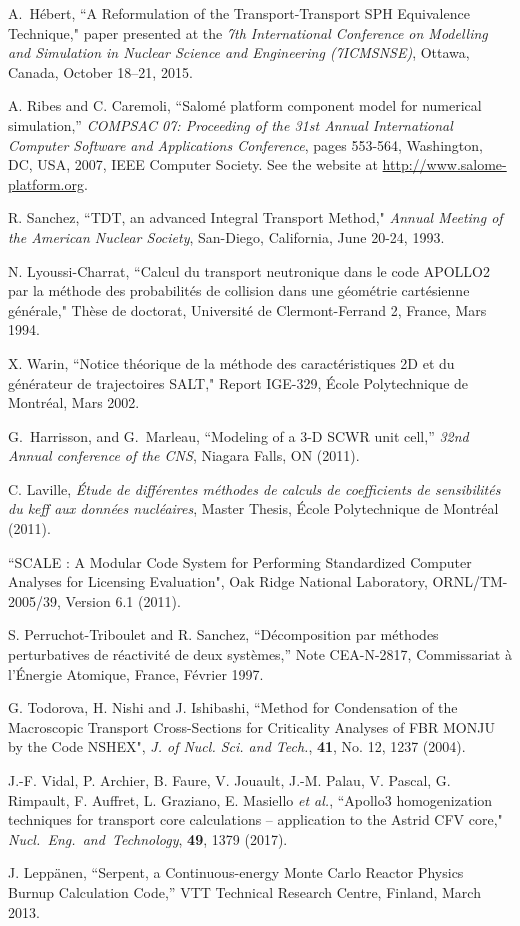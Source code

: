 \begin{thebibliography}{99}
A.~H\'ebert, ``A Reformulation of the Transport-Transport SPH Equivalence Technique," paper presented at the
\textsl{7th International Conference on Modelling and Simulation in Nuclear Science and Engineering (7ICMSNSE)}, Ottawa, Canada, October 18--21, 2015.

A. Ribes and C. Caremoli, ``Salom\'e platform component model for numerical simulation,'' {\sl COMPSAC 07: Proceeding of the 31st Annual International Computer Software and Applications Conference}, pages 553-564, Washington, DC, USA, 2007, IEEE Computer Society.
See the website at \url{http://www.salome-platform.org}.

R. Sanchez, ``TDT, an advanced Integral Transport Method," {\sl Annual Meeting of the American Nuclear Society}, San-Diego, California, June 20-24, 1993.

N. Lyoussi-Charrat, ``Calcul du transport neutronique dans le code APOLLO2 par la m\'ethode des probabilit\'es de
collision dans une g\'eom\'etrie cart\'esienne g\'en\'erale," Th\`ese de doctorat, Universit\'e de Clermont-Ferrand 2, France,
Mars 1994.

X. Warin, ``Notice th\'eorique de la m\'ethode des caract\'eristiques 2D et du g\'en\'erateur de trajectoires SALT," Report IGE-329, \'Ecole Polytechnique de Montr\'eal, Mars 2002.

 G.~Harrisson, and G.~Marleau, ``Modeling of a {3-D} {SCWR} unit cell,''
  {\sl 32nd Annual conference of the CNS}, Niagara Falls, ON (2011).

C. Laville, {\sl \'Etude de diff\'erentes m\'ethodes de calculs de coefficients de
sensibilit\'es du keff aux donn\'ees nucl\'eaires}, Master Thesis, \'Ecole Polytechnique de Montr\'eal (2011).

``SCALE : A Modular Code System for Performing Standardized Computer Analyses for Licensing Evaluation",
Oak Ridge National Laboratory, ORNL/TM-2005/39, Version 6.1 (2011).

S. Perruchot-Triboulet and R. Sanchez, ``D\'ecomposition par m\'ethodes perturbatives de r\'eactivit\'e de deux syst\`emes,'' Note CEA-N-2817, Commissariat \`a l'\'Energie Atomique, France, F\'evrier 1997.

G. Todorova, H. Nishi and J. Ishibashi, ``Method for Condensation of the Macroscopic Transport Cross-Sections for Criticality Analyses of FBR MONJU by the Code NSHEX", {\sl J. of Nucl. Sci. and Tech.},
{\bf 41}, No. 12, 1237 (2004).

J.-F. Vidal, P. Archier, B. Faure, V. Jouault, J.-M. Palau, V. Pascal, G. Rimpault, F. Auffret, L. Graziano, E. Masiello {\sl et al.}, ``Apollo3
homogenization techniques for transport core calculations -- application to the Astrid CFV core," {\sl Nucl.~Eng.~and~Technology}, {\bf 49}, 1379 (2017).

J. Lepp\"anen, ``Serpent, a Continuous-energy Monte Carlo Reactor Physics Burnup Calculation Code,'' VTT Technical Research Centre, Finland, March 2013.

\end{thebibliography}
